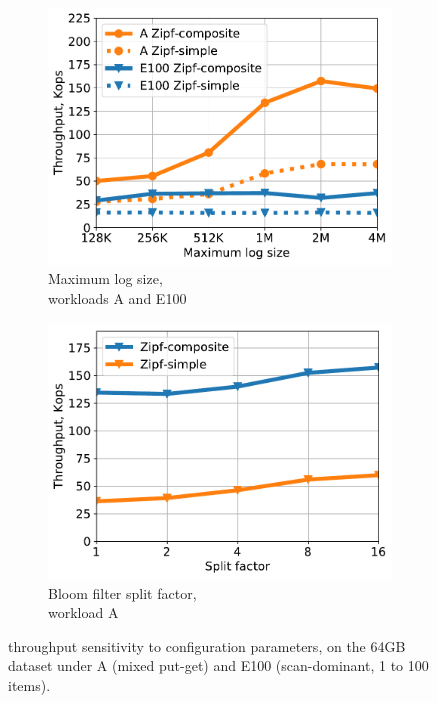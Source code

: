 {\begin{figure}[htb]
\centering
\begin{subfigure}{0.49\linewidth}
\includegraphics[width=\textwidth]{figs/max_log_size_line.pdf}
\caption{Maximum log size,\\  workloads A and E100}
\label{fig:params:log}
\end{subfigure}
\begin{subfigure}{0.49\linewidth}
\includegraphics[width=\textwidth]{figs/Bloom_filter_line.pdf}
\caption{Bloom filter split factor,\\ workload A}
\label{fig:params:bf}
\end{subfigure}
\caption{{\sys\/ throughput sensitivity to configuration parameters, on the 64GB dataset under  A (mixed put-get) and 
E100 (scan-dominant, 1 to 100 items).}}
\label{fig:params}
\end{figure}

}

